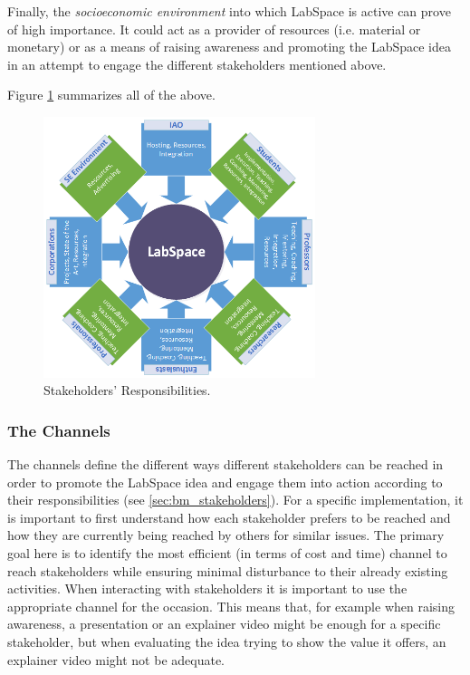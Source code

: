 \documentclass[a4paper, 11pt]{article}
\begin{document}
Finally, the \textit{socioeconomic environment} into which LabSpace is active can prove of high importance. It could act as a provider of resources (i.e. material or monetary) or as a means of raising awareness and promoting the LabSpace idea in an attempt to engage the different stakeholders mentioned above.

Figure \ref{fig:ls_responsibilities} summarizes all of the above.

\begin{figure}[h!]
  \begin{center}
    \includegraphics[width=300px,height=\textheight,keepaspectratio]{imagery/ls_stakeholders.png}
    \caption{Stakeholders' Responsibilities.}
    \label{fig:ls_responsibilities}
  \end{center}
\end{figure}


\subsubsection{The Channels}

The channels define the different ways different stakeholders can be reached in order to promote the LabSpace idea and engage them into action according to their responsibilities (see \ref{sec:bm_stakeholders}). For a specific implementation, it is important to first understand how each stakeholder prefers to be reached and how they are currently being reached by others for similar issues. The primary goal here is to identify the most efficient (in terms of cost and time) channel to reach stakeholders while ensuring minimal disturbance to their already existing activities. When interacting with stakeholders it is important to use the appropriate channel for the occasion. This means that, for example when raising awareness, a presentation or an explainer video might be enough for a specific stakeholder, but when evaluating the idea trying to show the value it offers, an explainer video might not be adequate.
\end{document}

